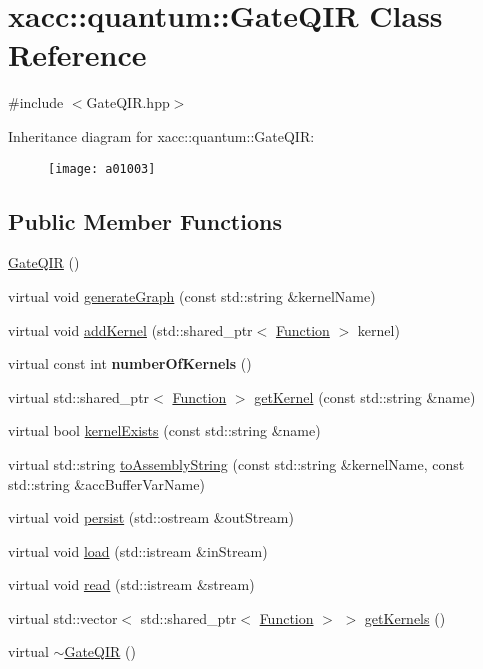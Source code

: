 \hypertarget{a01003}{}\section{xacc\+:\+:quantum\+:\+:Gate\+Q\+IR Class Reference}
\label{a01003}


{\ttfamily \#include $<$Gate\+Q\+I\+R.\+hpp$>$}

Inheritance diagram for xacc\+:\+:quantum\+:\+:Gate\+Q\+IR\+:\begin{figure}[H]
\begin{center}
\leavevmode
\texttt{[image: a01003]}
\end{center}
\end{figure}
\subsection*{Public Member Functions}
\begin{DoxyCompactItemize}
\item 
\hyperlink{a01003_afb99f610a6b123538c659169c131a634}{Gate\+Q\+IR} ()
\item 
virtual void \hyperlink{a01003_ad1ddd6105346dd9fc78648fd812285ed}{generate\+Graph} (const std\+::string \&kernel\+Name)
\item 
virtual void \hyperlink{a01003_aa6ed2cf2cbcfec8105c327a4fa95346f}{add\+Kernel} (std\+::shared\+\_\+ptr$<$ \hyperlink{a01127}{Function} $>$ kernel)
\item 
\mbox{\label{a01003_aca6be85526b14f500e7f98954dd6da5c}} 
virtual const int {\bfseries number\+Of\+Kernels} ()
\item 
virtual std\+::shared\+\_\+ptr$<$ \hyperlink{a01127}{Function} $>$ \hyperlink{a01003_a194758b6edcc3ae0c7fe8004f9bfe690}{get\+Kernel} (const std\+::string \&name)
\item 
virtual bool \hyperlink{a01003_a692f95099caa7c024110a3f035941dca}{kernel\+Exists} (const std\+::string \&name)
\item 
virtual std\+::string \hyperlink{a01003_a7153f7e9f516d43af3d5d4f95d60bd86}{to\+Assembly\+String} (const std\+::string \&kernel\+Name, const std\+::string \&acc\+Buffer\+Var\+Name)
\item 
virtual void \hyperlink{a01003_a40e1d07e4dfd3794ef53fca3cdbdca61}{persist} (std\+::ostream \&out\+Stream)
\item 
virtual void \hyperlink{a01003_a07f26eeb362ac480d20da6cdc8c8fb39}{load} (std\+::istream \&in\+Stream)
\item 
virtual void \hyperlink{a01003_a26019e2f1e13e64645e29aee86ac58b1}{read} (std\+::istream \&stream)
\item 
virtual std\+::vector$<$ std\+::shared\+\_\+ptr$<$ \hyperlink{a01127}{Function} $>$ $>$ \hyperlink{a01003_a4ace7ee5ebef84b1f39aaf5ed12c6cc6}{get\+Kernels} ()
\item 
virtual \hyperlink{a01003_ac88db03f1dd29e2d36aaa6c01a130008}{$\sim$\+Gate\+Q\+IR} ()
\end{DoxyCompactItemize}
